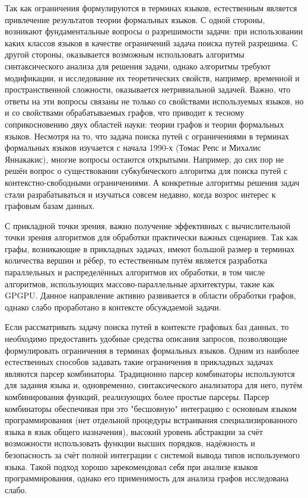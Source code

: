 \documentclass[12pt]{article}  %
\theoremstyle{remark}
\begin{document}
Так как ограничения формулируются в терминах языков, естественным является привлечение результатов теории формальных языков.
С одной стороны, возникают фундаментальные вопросы о разрешимости задачи: при использовании каких классов языков в качестве ограничений задача поиска путей разрешима.
С другой стороны, оказывается возможным использовать алгоритмы синтаксического анализа для решения задачи, однако алгоритмы требуют модификации, и исследование их теоретических свойств, например, временной и пространственной сложности, оказывается нетривиальной задачей.
Важно, что ответы на эти вопросы связаны не только со свойствами используемых языков, но и со свойствами обрабатываемых графов, что приводит к тесному соприкосновению двух областей науки: теории графов и теории формальных языков.
Несмотря на то, что задача поиска путей с ограничениями в терминах формальных языков изучается с начала 1990-х (Томас Репс и Михалис Яннакакис), многие вопросы остаются открытыми.
Например, до сих пор не решён вопрос о существовании субкубического алгоритма для поиска путей с контекстно-свободными ограничениями.
А конкретные алгоритмы решения задач стали разрабатываться и изучаться совсем недавно, когда возрос интерес к графовым базам данных.

С прикладной точки зрения, важно получение эффективных с вычислительной точки зрения алгоритмов для обработки практически важных сценариев.
Так как графы, возникающие в прикладных задачах, имеют большой размер в терминах количества вершин и рёбер, то естественным путём является разработка параллельных и распределённых алгоритмов их обработки, в том числе алгоритмов, использующих массово-параллельные архитектуры, такие как GPGPU.
Данное направление активно развивается в области обработки графов, однако слабо проработано в контексте обсуждаемой задачи.

Если рассматривать задачу поиска путей в контексте графовых баз данных, то необходимо предоставить удобные средства описания запросов, позволяющие формулировать ограничения в терминах формальных языков.
Одним из наиболее естественных способов задавать такие ограничения в прикладных задачах являются парсер комбинаторы. 
Традиционно парсер комбинаторы используются для задания языка и, одновременно, синтаксического анализатора для него, путём комбинирования функций, реализующих более простые парсеры.
Парсер комбинаторы обеспечивая при это "бесшовную" интеграцию с основным языком программирования (нет отдельной процедуры встраивания специализированного языка в язык общего назначения), высокий уровень абстракции за счёт возможности использовать функции высших порядков, надёжность и безопасность за счёт полной интеграции с системой вывода типов используемого языка.
Такой подход хорошо зарекомендовал себя при анализе языков программирования, однако его применимость для анализа графов исследована слабо.
\end{document}
